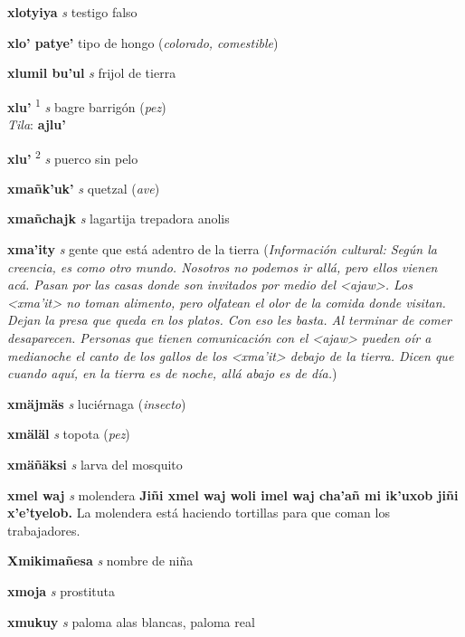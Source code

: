 \documentclass[10pt]{scrbook}
\newcommand{\entry}[1]{\textbf{#1}}
\newcommand{\defsuperscript}[1]{\textsuperscript{#1}}
\newcommand{\partofspeech}[1]{\textit{#1}}
\newcommand{\spanishtranslation}[1]{#1}
\newcommand{\clarification}[1]{(\textit{#1})}
\newcommand{\cholexample}[1]{\textbf{#1}}
\newcommand{\exampletranslation}[1]{#1}
\newcommand{\dialectvariant}[1]{\\\textit{#1}:}
\newcommand{\dialectword}[1]{\textbf{#1}}
\newcommand{\culturalinformation}[1]{(\textit{#1})}
\begin{document}
\begin{multicols}{2}
\entry{xlotyiya}
\partofspeech{s}
\spanishtranslation{testigo falso}

\entry{xlo' patye'}
\spanishtranslation{tipo de hongo}
\clarification{colorado, comestible}

\entry{xlumil bu'ul}
\partofspeech{s}
\spanishtranslation{frijol de tierra}

\entry{xlu'}
\defsuperscript{1}
\partofspeech{s}
\spanishtranslation{bagre barrigón}
\clarification{pez}
\dialectvariant{Tila}
\dialectword{ajlu'}

\entry{xlu'}
\defsuperscript{2}
\partofspeech{s}
\spanishtranslation{puerco sin pelo}

\entry{xmañk'uk'}
\partofspeech{s}
\spanishtranslation{quetzal}
\clarification{ave}

\entry{xmañchajk}
\partofspeech{s}
\spanishtranslation{lagartija trepadora}
\spanishtranslation{anolis}

\entry{xma'ity}
\partofspeech{s}
\spanishtranslation{gente que está adentro de la tierra}
\culturalinformation{Información cultural: Según la creencia, es como otro mundo. Nosotros no podemos ir allá, pero ellos vienen acá. Pasan por las casas donde son invitados por medio del <ajaw>. Los <xma'it> no toman alimento, pero olfatean el olor de la comida donde visitan. Dejan la presa que queda en los platos. Con eso les basta. Al terminar de comer desaparecen. Personas que tienen comunicación con el <ajaw> pueden oír a medianoche el canto de los gallos de los <xma'it> debajo de la tierra. Dicen que cuando aquí, en la tierra es de noche, allá abajo es de día.}

\entry{xmäjmäs}
\partofspeech{s}
\spanishtranslation{luciérnaga}
\clarification{insecto}

\entry{xmäläl}
\partofspeech{s}
\spanishtranslation{topota}
\clarification{pez}

\entry{xmäñäksi}
\partofspeech{s}
\spanishtranslation{larva del mosquito}

\entry{xmel waj}
\partofspeech{s}
\spanishtranslation{molendera}
\cholexample{Jiñi xmel waj woli imel waj cha'añ mi ik'uxob jiñi x'e'tyelob.}
\exampletranslation{La molendera está haciendo tortillas para que coman los trabajadores.}

\entry{Xmikimañesa}
\partofspeech{s}
\spanishtranslation{nombre de niña}

\entry{xmoja}
\partofspeech{s}
\spanishtranslation{prostituta}

\entry{xmukuy}
\partofspeech{s}
\spanishtranslation{paloma alas blancas, paloma real}


\end{multicols}
\end{document}
